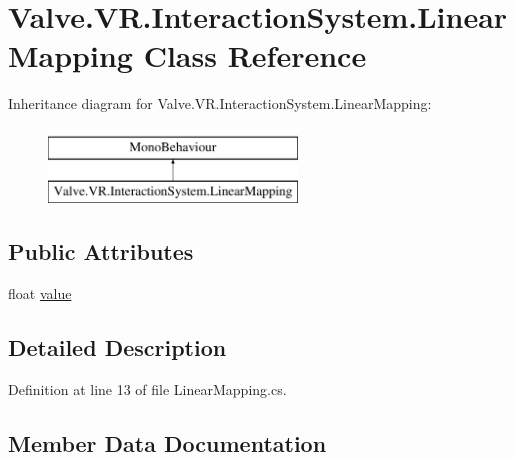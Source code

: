 \hypertarget{class_valve_1_1_v_r_1_1_interaction_system_1_1_linear_mapping}{}\section{Valve.\+V\+R.\+Interaction\+System.\+Linear\+Mapping Class Reference}
\label{class_valve_1_1_v_r_1_1_interaction_system_1_1_linear_mapping}
Inheritance diagram for Valve.\+V\+R.\+Interaction\+System.\+Linear\+Mapping\+:\begin{figure}[H]
\begin{center}
\leavevmode
\includegraphics[height=2.000000cm]{class_valve_1_1_v_r_1_1_interaction_system_1_1_linear_mapping}
\end{center}
\end{figure}
\subsection*{Public Attributes}
\begin{DoxyCompactItemize}
\item 
float \mbox{\hyperlink{class_valve_1_1_v_r_1_1_interaction_system_1_1_linear_mapping_a775b4f01f606f8083af2dc1ae0f373a5}{value}}
\end{DoxyCompactItemize}


\subsection{Detailed Description}


Definition at line 13 of file Linear\+Mapping.\+cs.



\subsection{Member Data Documentation}
\mbox{\label{class_valve_1_1_v_r_1_1_interaction_system_1_1_linear_mapping_a775b4f01f606f8083af2dc1ae0f373a5}} 
